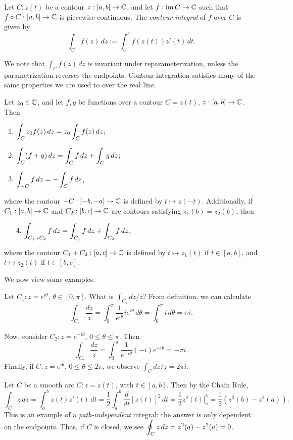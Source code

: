 \documentclass{article}
\begin{document}
\begin{definition}
Let $C: z(t)$ be a contour $z: [a, b]\to \mathbb C$, and let $f: \operatorname{im} C \to \mathbb C$ such that $f\circ C: [a, b]\to \mathbb C$ is piecewise continuous. The \textit{contour integral} of $f$ over $C$ is given by
$$\int_C f(z)\, dz := \int_a^b f(z(t)) z'(t)\, dt.$$
\end{definition}
We note that $\int_C f(z)\, dz$ is invariant under reparameterization, unless the parametrization reverses the endpoints. Contour integration satisfies many of the same properties we are used to over the real line.
\begin{proposition}
Let $z_0\in\mathbb C$, and let $f, g$ be functions over a contour $C = z(t)$, $z: [a, b]\to \mathbb C$. Then
\begin{enumerate}
    \item $\displaystyle\int_C z_0f(z)\, dz = z_0 \int_C f(z)\, dz$;
    \item $\displaystyle\int_C (f+g)\, dz = \int_C f\,dz + \int_C g\, dz$;
    \item $\displaystyle\int_{-C} f\, dz = -\int_C f\, dz$,
\end{enumerate}
where the contour $-C: [-b, -a]\to \mathbb C$ is defined by $t\mapsto z(-t)$. Additionally, if $C_1: [a, b]\to \mathbb C$ and $C_2: [b, c]\to \mathbb C$ are contours satisfying $z_1(b) = z_2(b)$, then
\begin{enumerate}
    \item[4.] $\displaystyle\int_{C_1+C_2} f\, dz = \int_{C_1} f\, dz + \int_{C_2} f\, dz$,
\end{enumerate}
where the contour $C_1+C_2: [a, c]\to \mathbb C$ is defined by $t\mapsto z_1(t)$ if $t\in [a, b]$, and $t\mapsto z_2(t)$ if $t\in [b, c]$.
\end{proposition}
We now view some examples.
\begin{example}
Let $C_1: z=e^{i\theta}$, $\theta\in [0, \pi]$. What is $\int_{C_1} dz/z$? From definition, we can calculate
$$\int_{C_1} \frac{dz}z = \int_0^\pi \frac 1{e^{i\theta}}ie^{i\theta}\, d\theta  =\int_0^\pi i\, d\theta = \pi i.$$

Now, consider $C_2: z= e^{-i\theta}$, $0\leq \theta\leq \pi$. Then
$$\int_{C_2}\frac{dz}z = \int_0^\pi \frac 1{e^{-i\theta}}(-i)e^{-i\theta} = -\pi i.$$
Finally, if $C: z=e^{i\theta}$, $0\leq \theta\leq 2\pi$, we observe $\int_C dz/z = 2\pi i$.
\end{example}
\begin{example}
Let $C$ be a smooth arc $C: z = z(t)$, with $t\in[a,b]$. Then by the Chain Rule,
$$\int_C z\, dz = \int_a^b z(t)z'(t) \, dt = \frac 12\int_a^b \frac{d}{dt}[z(t)]^2\, dt = \frac 12z^2(t)\Big\vert_a^b = \boxed{\frac 12(z^2(b) - z^2(a))}.$$
This is an example of a \textit{path-independent} integral: the answer is only dependent on the endpoints. Thus, if $C$ is closed, we see $\displaystyle\oint_C z\, dz = z^2(a) - z^2(a) = 0$.
\end{example}
\end{document}
